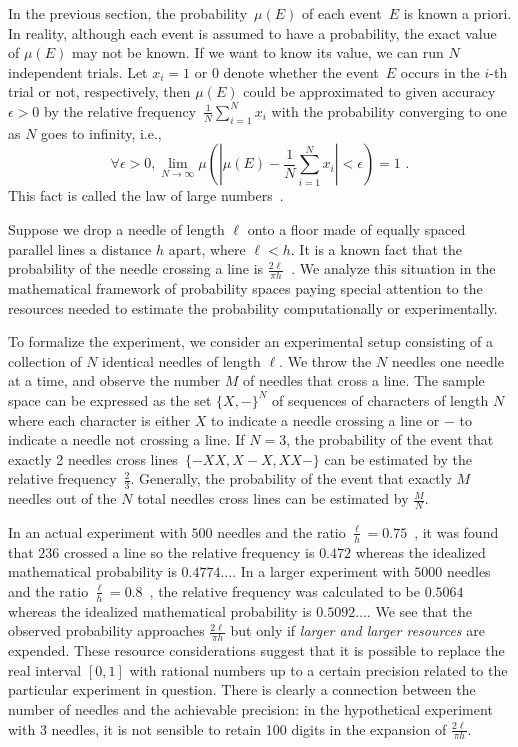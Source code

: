 \documentclass{article}
\theoremstyle{remark}
\newcommand{\pmeas}{\ensuremath{\mu}}
\begin{document}
In the previous section, the probability~$\pmeas(E)$ of each event~$E$
is known a priori. In reality, although each event is assumed to have
a probability, the exact value of $\pmeas(E)$ may not be known. If
we want to know its value, we can run $N$ independent trials. Let
$x_{i}=1$ or $0$ denote whether the event~$E$ occurs in the $i$-th
trial or not, respectively, then $\pmeas(E)$ could be approximated
to given accuracy~$\epsilon>0$ by the relative frequency~$\frac{1}{N}\sum_{i=1}^{N}x_{i}$
with the probability converging to one as $N$ goes to infinity, i.e.,
\[
\forall\epsilon>0,\lim_{N\rightarrow\infty}\pmeas\left(\left|\pmeas(E)-\frac{1}{N}\sum_{i=1}^{N}x_{i}\right|<\epsilon\right)=1\textrm{ .}
\]
This fact is called the law of large numbers~\cite{Bernoulli2006,Kolmogorov1950,Uspensky1937,Shafer1976,544199}.

Suppose we drop a needle of length $\ell$ onto a floor made of equally
spaced parallel lines a distance $h$ apart, where $\ell<h$. It is
a known fact that the probability of the needle crossing a line is
$\frac{2\ell}{\pi h}$~\cite{Buffon1777,DeMorgan1872,Hall1873,Uspensky1937}.
We analyze this situation in the mathematical framework of probability
spaces paying special attention to the resources needed to estimate
the probability computationally or experimentally.

To formalize the experiment, we consider an experimental setup consisting
of a collection of $N$ identical needles of length $\ell$. We throw
the $N$ needles one needle at a time, and observe the number $M$
of needles that cross a line. The sample space can be expressed as
the set $\{X,-\}^{N}$ of sequences of characters of length $N$ where
each character is either $X$ to indicate a needle crossing a line
or $-$ to indicate a needle not crossing a line. If $N=3$, the probability
of the event that exactly 2 needles cross lines~$\{-XX,X{-}X,XX-\}$
can be estimated by the relative frequency~$\frac{2}{3}$. Generally,
the probability of the event that exactly $M$ needles out of the
$N$ total needles cross lines can be estimated by $\frac{M}{N}$.

In an actual experiment with $500$ needles and the ratio
$\frac{\ell}{h}=0.75$~\cite{Hall1873}, it was found that $236$ crossed
a line so the relative frequency is $0.472$ whereas the idealized
mathematical probability is $0.4774\ldots$. In a larger experiment
with $5000$ needles and the ratio
$\frac{\ell}{h}=0.8$~\cite{Uspensky1937}, the relative frequency was
calculated to be $0.5064$ whereas the idealized mathematical
probability is $0.5092\ldots$. We see that the observed probability
approaches $\frac{2\ell}{\pi h}$ but only if \emph{larger and larger
  resources} are expended. These resource considerations suggest that
it is possible to replace the real interval $[0,1]$ with rational
numbers up to a certain precision related to the particular experiment
in question.  There is clearly a connection between the number of
needles and the achievable precision: in the hypothetical experiment
with 3 needles, it is not sensible to retain 100 digits in the
expansion of $\frac{2\ell}{\pi h}$.
\end{document}
